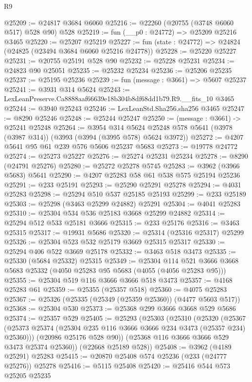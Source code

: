\begin{lexlean}{R9}
\begin{coremodule}
@25209 := @24817 @3684 @6060
@25216 := @22260 (@20755 (@3748 @6060 @517) @528 @90) @528
@25219 := fun (__p0 : @24772) => @25209 @25216 @3465
@25220 := @25207 @25219
@25227 := fun (state : @24772) => @24824 (@24825 (@23494 @3684 @6060 @25216 @24778))
@25228 := @25220 @25227
@25231 := @20755 @25191 @528 @90
@25232 := @25228 @25231
@25234 := @24823 @90 @25051
@25235 := @25232 @25234
@25236 := @25206 @25235
@25237 := @25195 @25236
@25239 := fun (message : @3661) => @5607 @25237
@25241 := @3931 @314 @5624
@25243 := LexLeanPreserve.Ca8888aaf66639e18b304b8df68dd1b79.R9.__fits_10 @3465
@25244 := @3940 @25243
@25246 := LexLeanStd.Sha256.sha256 @3465
@25247 := @8290 @25246
@25248 := @25244 @25247
@25250 := (message : @3661) -> @25241 @25248
@25264 := @3954
    @314
    @5624
    @25248
    @578
    @5641
    (@3978 (@3987 @314))
    (@3993 (@3994 (@3995 @578) @5624 @3972))
@25272 := @4207 @5641 @95 @61 @239 @576 @5606 @25237 @5683
@25273 := @19778 @24772
@25274 := @25273 @25227
@25276 := @25274 @25231 @25234
@25278 := @8290 (@24791 @25276)
@25280 := @25272 @25278 @5745
@25283 := @3962 (@3966 @5683) @5641
@25290 := @4207 @25283 @58 @61 @538 @575 @25194 @25236
@25291 := @233 @25191
@25293 := @25290 @25291 @25278
@25294 := @4031 @25283
@25298 := @25294 @510 @537 @25185 @25193
@25299 := @233 @25189
@25303 := @25298 (@3463 @25299 @24882) @25291
@25304 := @4041 @25283
@25310 := @25304 @534 @536 @25183 @3668 @25299 @24882
@25314 := @25294 @512 @533 @25181 @3666
@25315 := @233 @25176
@25316 := @3463 @25315
@25317 := @19931 @5686
@25320 := @25314 (@25316 @25317) @25299
@25326 := @25304 @523 @532 @25179 @3669 @25315 @25317
@25330 := @25294 @406 @522 @3669 @25178
@25332 := @3463 @518 @3473
@25335 := @25330 (@5684 @25332) @25315
@25349 := @25304
    @114
    @521
    @3666
    @3668
    @5683
    @25332
    (@4050 @25283 @95 @5683 (@4055 (@4056 @25283 @95)))
@25355 := @25304 @519 @116 @3666 @3666 @518 @3473
@25357 := @4168 @25283 @61
@25359 := @25355 (@25357 @518)
@25360 := @4075 @25283
@25367 := @25326 (@25335 (@25349 (@25359 @25360)) (@4477 @5603 @517))
@25368 := @25304 @530
@25373 := @25368 @299 @3666 @3668 @529 @5686
@25374 := @25357 @529
@25405 := @25293
    (@25303
      (@25310
        (@25320
          (@25367 (@25373 @25374 (@25304 @235 @116 @3666 @3666 @234 @3473 (@25357 @234) @25360)))
          (@20986 @25176 @528 @90))
        (@25368 @116 @3666 @3666 @529 @3473 @25374 @25360))
      (@22668 @25189 @528))
@25408 := @3962 (@4189 @25291) @25283
@25415 := @20870 @25408 @574 @25236 (@233 (@24777 @25276)) @25278
@25416 := @5115 @25408
@25420 := @25416 @544 @573 @25205 @25235

\end{coremodule}
\end{lexlean}
